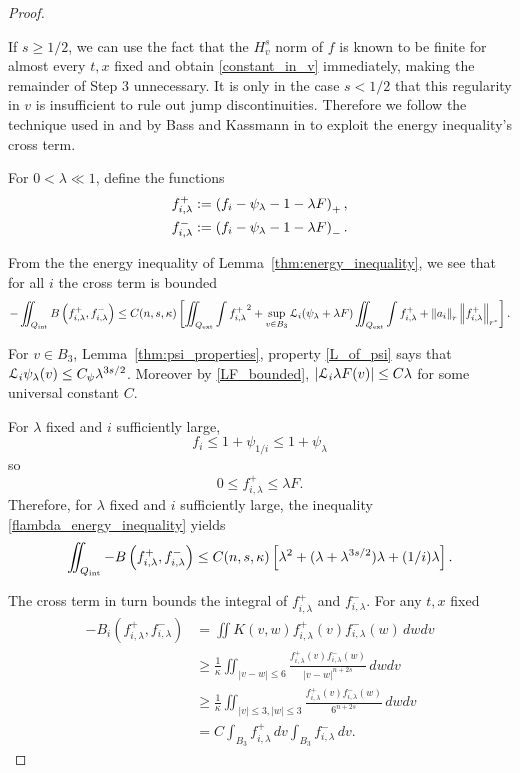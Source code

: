 \begin{proof}
\begin{remark}
If $s \geq 1/2$, we can use the fact that the $H^s_v$ norm of $f$ is known to be finite for almost every $t,x$ fixed and obtain \eqref{constant_in_v} immediately, making the remainder of Step 3 unnecessary.  It is only in the case $s < 1/2$ that this regularity in $v$ is insufficient to rule out jump discontinuities.  Therefore we follow the technique used in \cite{CaChVa} and by Bass and Kassmann in \cite{BaKa} to exploit the energy inequality's cross term.  
\end{remark}

\newcommand{\flambda}{f_{i,\lambda}^+}
\newcommand{\flambdam}{f_{i,\lambda}^-}
For $0 < \lambda \ll 1$, define the functions
\begin{align*} 
\flambda &:= \paren{f_i - \psi_\lambda - 1 - \lambda F}_+, \\
\flambdam &:= \paren{f_i - \psi_\lambda - 1 - \lambda F}_-.
\end{align*}

From the the energy inequality of Lemma~\ref{thm:energy_inequality}, we see that for all $i$ the cross term is bounded
\begin{equation}\label{flambda_energy_inequality}
-\iint_\Qint B\paren{\flambda, \flambdam} \leq C(n,s,\kappa) \bracket{\iint_\Qext \int {\flambda}^2 + \sup_{v\in B_3} \L_i(\psi_\lambda + \lambda F) \iint_\Qext\int \flambda + \norm{a_i}_{\sourceexp} \norm{\flambda}_{\sourceexp^\ast}}. 
\end{equation}

For $v \in B_3$, Lemma~\ref{thm:psi_properties}, property \eqref{L_of_psi} says that $\mathcal{L}_i \psi_\lambda(v) \leq C_\psi \lambda^{3s/2}$.  Moreover by \eqref{LF_bounded}, $\left\lvert \mathcal{L}_i \lambda F(v) \right\rvert \leq C\lambda$ for some universal constant $C$.  

For $\lambda$ fixed and $i$ sufficiently large, 
\[ f_i \leq 1+\psi_{1/i} \leq 1+\psi_\lambda \]
so
\[ 0 \leq \flambda \leq \lambda F. \]
Therefore, for $\lambda$ fixed and $i$ sufficiently large, the inequality \eqref{flambda_energy_inequality} yields
\[ \iint_\Qint -B\paren{\flambda, \flambdam} \leq C(n,s,\kappa) \bracket{\lambda^2 + (\lambda + \lambda^{3s/2})\lambda + (1/i)\lambda}. \]

The cross term in turn bounds the integral of $\flambda$ and $\flambdam$.  For any $t,x$ fixed
\begin{align*}
-B_i(\flambda, \flambdam) &= \iint K(v,w) \flambda(v) \flambdam(w) \,dwdv
\\ &\geq \frac{1}{\kappa} \iint_{|v-w| \leq 6} \frac{\flambda(v) \flambdam(w)}{|v-w|^{n+2s}} \,dwdv
\\ &\geq \frac{1}{\kappa} \iint_{|v|\leq 3, |w|\leq 3} \frac{\flambda(v) \flambdam(w)}{6^{n+2s}} \,dwdv
\\ &= C \int_{B_3} \flambda \,dv \int_{B_3} \flambdam \,dv.
\end{align*}


\end{proof}
